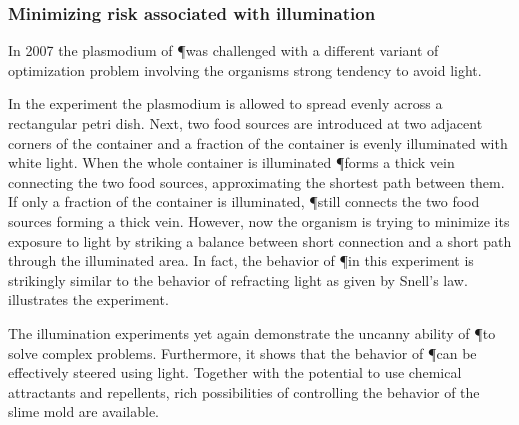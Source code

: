			\FloatBarrier

		\subsubsection{Minimizing risk associated with illumination}

			In 2007 the plasmodium of \P was challenged with a different variant of optimization problem involving the organisms strong tendency to avoid light. 

			In the experiment the plasmodium is allowed to spread evenly across a rectangular petri dish. Next, two food sources are introduced at two adjacent corners of the container and a fraction of the container is evenly illuminated with white light. When the whole container is illuminated \P forms a thick vein connecting the two food sources, approximating the shortest path between them. If only a fraction of the container is illuminated, \P still connects the two food sources forming a thick vein. However, now the organism is trying to minimize its exposure to light by striking a balance between short connection and a short path through the illuminated area. In fact, the behavior of \P in this experiment is strikingly similar to the behavior of refracting light as given by Snell's law.  illustrates the experiment.

			The illumination experiments yet again demonstrate the uncanny ability of \P to solve complex problems. Furthermore, it shows that the behavior of \P can be effectively steered using light. Together with the potential to use chemical attractants and repellents, rich possibilities of controlling the behavior of the slime mold are available.

